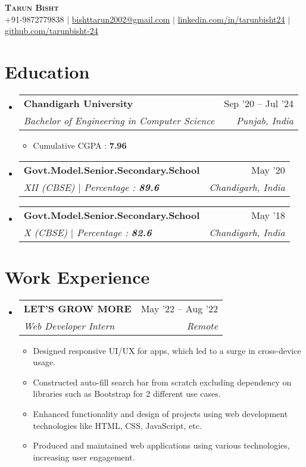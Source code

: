 \documentclass[letterpaper,11pt]{article}
\makeatletter
\newcommand{\resumeItem}[1]{
  \item\small{
    {#1 \vspace{-2pt}}
  }
}
\newcommand{\resumeSubheading}[4]{
  \vspace{-2pt}\item
    \begin{tabular*}{0.97\textwidth}[t]{l@{\extracolsep{\fill}}r}
      \textbf{#1} & #2 \\
      \textit{\small#3} & \textit{\small #4} \\
    \end{tabular*}\vspace{-7pt}
}
\newcommand{\resumeSubHeadingListStart}{\begin{itemize}[leftmargin=0.15in, label={}]}
\newcommand{\resumeSubHeadingListEnd}{\end{itemize}}
\newcommand{\resumeItemListStart}{\begin{itemize}}
\newcommand{\resumeItemListEnd}{\end{itemize}\vspace{-5pt}}
\makeatother
\begin{document}
\begin{center}
    \textbf{\Huge \scshape Tarun Bisht} \\ \vspace{1pt}
    \small +91-9872779838 $|$ \href{mailto:bishttarun2002@gmail.com}{bishttarun2002@gmail.com} $|$ 
    \href{https://www.linkedin.com/in/tarunbisht24/}{{\underline{linkedin.com/in/tarunbisht24}}} $|$
    \href{https://github.com/tarunbisht-24}{\underline{github.com/tarunbisht-24}}
\end{center}


\section{Education}
  \resumeSubHeadingListStart
    \resumeSubheading
      {Chandigarh University}{Sep '20 -- Jul '24}
      {Bachelor of Engineering in Computer Science}{Punjab, India}
      \resumeItemListStart
        \resumeItem{Cumulative CGPA : \textbf{7.96}}
      \resumeItemListEnd
    \resumeSubheading
      {Govt.Model.Senior.Secondary.School}{May '20}
      {XII (CBSE) $|$ Percentage : \textbf{89.6}}{Chandigarh, India}
    \resumeSubheading
      {Govt.Model.Senior.Secondary.School}{May '18}
      {X (CBSE) $|$ Percentage : \textbf{82.6}}{Chandigarh, India}
  \resumeSubHeadingListEnd

\section{Work Experience}
  \resumeSubHeadingListStart
    \resumeSubheading
      {LET'S GROW MORE}{May '22 -- Aug '22}
      {Web Developer Intern}{Remote}
          \resumeItemListStart
            \resumeItem{Designed responsive UI/UX for apps, which led to a surge in cross-device usage.}
            \resumeItem{Constructed auto-fill search bar from scratch excluding dependency on libraries such as Bootstrap for 2 different
            use cases.}
            \resumeItem{Enhanced functionality and design of projects using web development technologies like HTML, CSS, JavaScript,
             etc.}
             \resumeItem{Produced and maintained web applications using various technologies, increasing user engagement.}
          \resumeItemListEnd
    \resumeSubHeadingListEnd
\end{document}
